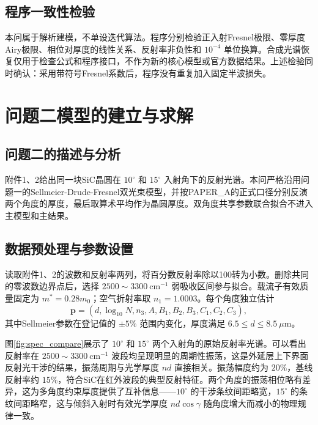 \documentclass[UTF8,fontset=fandol,12pt,a4paper]{ctexart}
\begin{document}
	\subsection{程序一致性检验}
	
	本问属于解析建模，不单设迭代算法。程序分别检验正入射Fresnel极限、零厚度Airy极限、相位对厚度的线性关系、反射率非负性和 $10^{-4}$ 单位换算。合成光谱恢复仅用于检查公式和程序接口，不作为新的核心模型或官方数据结果。上述检验同时确认：采用带符号Fresnel系数后，程序没有重复加入固定半波损失。
	
	\section{问题二模型的建立与求解}
	
	\subsection{问题二的描述与分析}
	
	附件1、2给出同一块SiC晶圆在 $10^\circ$ 和 $15^\circ$ 入射角下的反射光谱。本问严格沿用问题一的Sellmeier-Drude-Fresnel双光束模型，并按PAPER\_A的正式口径分别反演两个角度的厚度，最后取算术平均作为晶圆厚度。双角度共享参数联合拟合不进入主模型和主结果。
	
	\subsection{数据预处理与参数设置}
	
	读取附件1、2的波数和反射率两列，将百分数反射率除以100转为小数。删除共同的零波数边界点后，选择 $2500\sim3300\ \mathrm{cm^{-1}}$ 弱吸收区间参与拟合。载流子有效质量固定为 $m^*=0.28m_0$；空气折射率取 $n_1=1.0003$。每个角度独立估计
	\begin{equation}
		\mathbf{p} = (d,\log_{10}N,n_3,A,B_1,B_2,B_3,C_1,C_2,C_3),
	\end{equation}
	其中Sellmeier参数在登记值的 $\pm5\%$ 范围内变化，厚度满足 $6.5\le d\le 8.5\ \mu\mathrm{m}$。
	
	图\ref{fig:spec_compare}展示了 $10^\circ$ 和 $15^\circ$ 两个入射角的原始反射率光谱。可以看出反射率在 $2500\sim3300\ \mathrm{cm^{-1}}$ 波段均呈现明显的周期性振荡，这是外延层上下界面反射光干涉的结果，振荡周期与光学厚度 $nd$ 直接相关。振荡幅度约为 $20\%$，基线反射率约 $15\%$，符合SiC在红外波段的典型反射特征。两个角度的振荡相位略有差异，这为多角度约束厚度提供了互补信息——$10^\circ$ 的干涉条纹间距略宽，$15^\circ$ 的条纹间距略窄，这与倾斜入射时有效光学厚度 $nd\cos\gamma$ 随角度增大而减小的物理规律一致。
	
\end{document}

